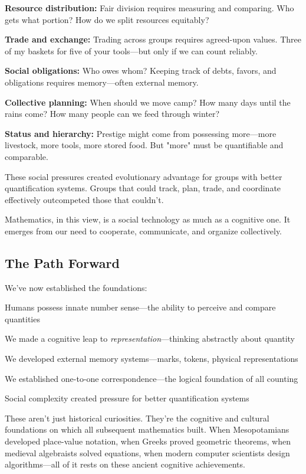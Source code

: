 \textbf{Resource distribution:} Fair division requires measuring and comparing. Who gets what portion? How do we split resources equitably?

\textbf{Trade and exchange:} Trading across groups requires agreed-upon values. Three of my baskets for five of your tools—but only if we can count reliably.

\textbf{Social obligations:} Who owes whom? Keeping track of debts, favors, and obligations requires memory—often external memory.

\textbf{Collective planning:} When should we move camp? How many days until the rains come? How many people can we feed through winter?

\textbf{Status and hierarchy:} Prestige might come from possessing more—more livestock, more tools, more stored food. But "more" must be quantifiable and comparable.

These social pressures created evolutionary advantage for groups with better quantification systems. Groups that could track, plan, trade, and coordinate effectively outcompeted those that couldn't.

Mathematics, in this view, is a social technology as much as a cognitive one. It emerges from our need to cooperate, communicate, and organize collectively.

\subsection{The Path Forward}

We've now established the foundations:
\begin{compactitem}
	\item Humans possess innate number sense—the ability to perceive and compare quantities
	\item We made a cognitive leap to \textit{representation}—thinking abstractly about quantity
	\item We developed external memory systems—marks, tokens, physical representations
	\item We established one-to-one correspondence—the logical foundation of all counting
	\item Social complexity created pressure for better quantification systems
\end{compactitem}

These aren't just historical curiosities. They're the cognitive and cultural foundations on which all subsequent mathematics built. When Mesopotamians developed place-value notation, when Greeks proved geometric theorems, when medieval algebraists solved equations, when modern computer scientists design algorithms—all of it rests on these ancient cognitive achievements.

